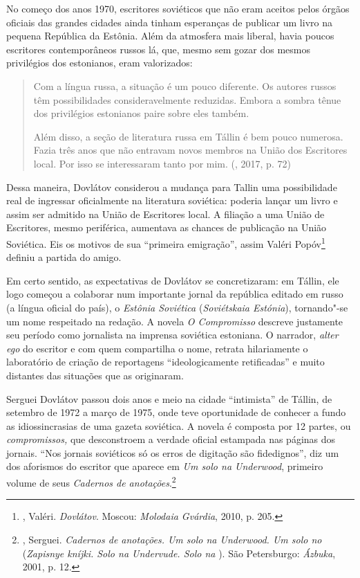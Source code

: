 No começo dos anos 1970, escritores soviéticos que não eram aceitos
pelos órgãos oficiais das grandes cidades ainda tinham esperanças de
publicar um livro na pequena República da Estônia. Além da atmosfera
mais liberal, havia poucos escritores contemporâneos russos lá, que,
mesmo sem gozar dos mesmos privilégios dos estonianos, eram valorizados:

\begin{quote}
Com a língua russa, a situação é um pouco diferente. Os au­tores russos
têm possibilidades consideravelmente reduzidas. Embora a sombra tênue
dos privilégios estonianos paire sobre eles também.

Além disso, a seção de literatura russa em Tállin é bem pou­co numerosa.
Fazia três anos que não entravam novos mem­bros na União dos Escritores
local. Por isso se interessaram tanto por mim. (, 2017, p. 72)
\end{quote}

Dessa maneira, Dovlátov considerou a mudança para Tallin uma
possibilidade real de ingressar oficialmente na literatura soviética:
poderia lançar um livro e assim ser admitido na União de Escritores
local. A filiação a uma União de Escritores, mesmo periférica, aumentava
as chances de publicação na União Soviética. Eis os motivos de sua
``primeira emigração'', assim Valéri Popóv\footnote{, Valéri.
  \emph{Dovlátov}. Moscou: \emph{Molodaia Gvárdia}, 2010, p. 205.}
definiu a partida do amigo.

Em certo sentido, as expectativas de Dovlátov se concretizaram: em
Tállin, ele logo começou a colaborar num importante jornal da república
editado em russo (a língua oficial do país), o \emph{Estônia Soviética}
(\emph{Soviétskaia Estónia}), tornando"-se um nome respeitado na redação.
A novela \emph{O Compromisso} descreve justamente seu período como
jornalista na imprensa soviética estoniana. O narrador, \emph{alter ego}
do escritor e com quem compartilha o nome, retrata hilariamente o
laboratório de criação de reportagens ``ideologicamente retificadas'' e
muito distantes das situações que as originaram.

\begin{center}
{}
\end{center}

Serguei Dovlátov passou dois anos e meio na cidade ``intimista'' de
Tállin, de setembro de 1972 a março de 1975, onde teve oportunidade de
conhecer a fundo as idiossincrasias de uma gazeta soviética. A novela é
composta por 12 partes, ou \emph{compromissos,} que desconstroem a
verdade oficial estampada nas páginas dos jornais. ``Nos jornais
soviéticos só os erros de digitação são fidedignos'', diz um dos
aforismos do escritor que aparece em \emph{Um solo na Underwood},
primeiro volume de seus \emph{Cadernos de anotações}.\footnote{,
  Serguei. \emph{Cadernos de anotações. Um solo na Underwood. Um solo no
  } (\emph{Zapisnye kníjki. Solo na Undervude. Solo na }). São
  Petersburgo: \emph{Ázbuka}, 2001, p. 12.}

